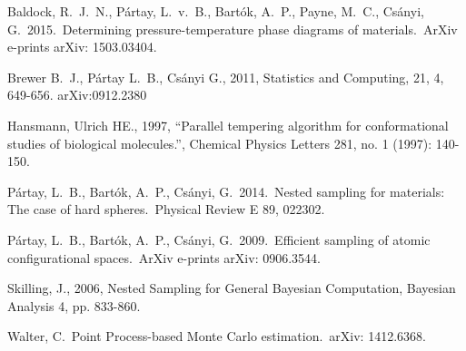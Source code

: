 \documentclass[journal,article,accept,moreauthors,pdftex,12pt,a4paper]{mdpi}
\begin{document}
\begin{thebibliography}{999} %

 Baldock, R.~J.~N., 
P{\'a}rtay, L.~v.~B., Bart{\'o}k, A.~P., Payne, M.~C., Cs{\'a}nyi, G.\ 
2015.\ Determining pressure-temperature phase diagrams of materials.\ ArXiv 
e-prints arXiv: 1503.03404. 

 Brewer B.~J., P{\'a}rtay L.~B., Cs{\'a}nyi G., 2011,
Statistics and Computing, 21, 4, 649-656. arXiv:0912.2380

 Hansmann, Ulrich HE., 1997, ``Parallel tempering algorithm for conformational studies of biological molecules.'', Chemical Physics Letters 281, no. 1 (1997): 140-150.

 P{\'a}rtay, L.~B., 
Bart{\'o}k, A.~P., Cs{\'a}nyi, G.\ 2014.\ Nested sampling for materials: 
The case of hard spheres.\ Physical Review E 89, 022302. 

 P{\'a}rtay, L.~B., 
Bart{\'o}k, A.~P., Cs{\'a}nyi, G.\ 2009.\ Efficient sampling of atomic 
configurational spaces.\ ArXiv e-prints arXiv: 0906.3544. 

 Skilling, J., 2006, Nested Sampling for General Bayesian Computation, Bayesian Analysis 4, pp. 833-860.

Walter, C.\ Point Process-based Monte Carlo estimation.\ arXiv: 1412.6368.


\end{thebibliography}

%
%


%


%
\end{document}
